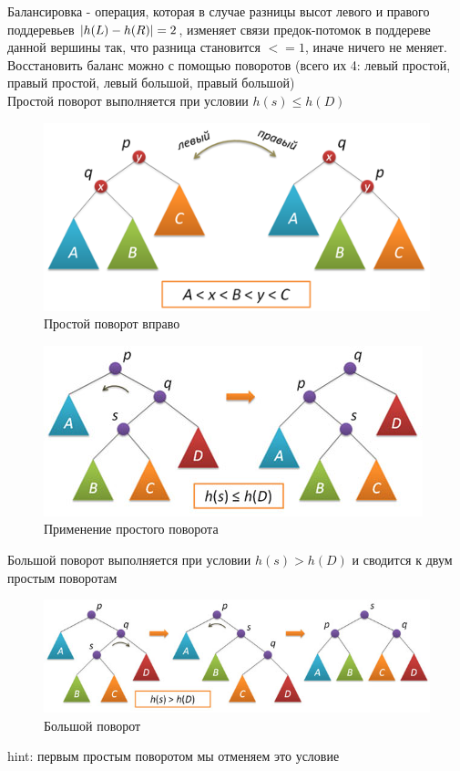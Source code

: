 \documentclass[discrete.tex]{subfiles}
\begin{document}
\begin{definition} [Балансировка]
    Балансировка - операция, которая в случае разницы высот левого и правого поддеревьев 
    $\left|h(L) - h(R)\right| = 2$, изменяет связи предок-потомок 
    в поддереве данной вершины так, что разница 
    становится $<= 1$, иначе ничего не меняет.\\
    Восстановить баланс можно с помощью поворотов (всего их 4: левый простой, 
    правый простой, левый большой, правый большой)\\
    Простой поворот выполняется при условии $h(s) \leq h(D)$
    \begin{figure}[H]
        \caption{Простой поворот вправо}
        \includegraphics[scale=0.5]{pics/33_1.png}
        \centering
    \end{figure}
    
    \begin{figure}[H]
        \caption{Применение простого поворота}
        \includegraphics[scale=0.5]{pics/33_2.jpg}
        \centering
    \end{figure}
    Большой поворот выполняется при условии $h(s) > h(D)$ и сводится к двум простым 
    поворотам
    \begin{figure}[H]
        \caption{Большой поворот}
        \includegraphics[scale=0.5]{pics/33_3.jpg}
        \centering
    \end{figure}
    hint: первым простым поворотом мы отменяем это условие

\end{definition}
\end{document}
